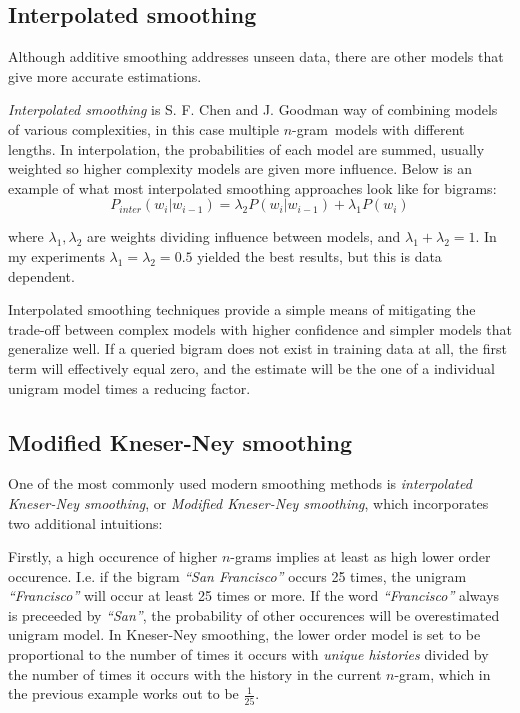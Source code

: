 \documentclass[a4paper,11pt]{kth-mag}
\newcommand{\ngram}{$n$-gram}
\begin{document}
\subsection{Interpolated smoothing}
Although additive smoothing addresses unseen data, there are other models that give more accurate estimations.

\emph{Interpolated smoothing} is S. F. Chen and J. Goodman way of combining models of various complexities,
in this case multiple \ngram~models with different lengths. In interpolation, the probabilities of each model are summed, usually weighted so higher complexity models are given more influence\cite{chen_goodman}.
Below is an example of what most interpolated smoothing approaches look like for bigrams:
\begin{equation}\label{eq:interpolated_smoothing}
  P_{inter}(w_i|w_{i-1}) =
  \lambda_2 P(w_i|w_{i-1}) + \lambda_1 P(w_i)
\end{equation}

where $\lambda_1, \lambda_2$ are weights dividing influence between models, and $\lambda_1 + \lambda_2 = 1$.
In my experiments $\lambda_1 = \lambda_2 = 0.5$ yielded the best results, but this is data dependent.

Interpolated smoothing techniques provide a simple means of mitigating
the trade-off between complex models with higher confidence
and simpler models that generalize well.
If a queried bigram does not exist in training data at all,
the first term will effectively equal zero,
and the estimate will be the one of a individual unigram model times a reducing factor.

\subsection{Modified Kneser-Ney smoothing}
One of the most commonly used modern smoothing methods is \emph{interpolated Kneser-Ney smoothing},
or \emph{Modified Kneser-Ney smoothing}\cite{nlp_book}, which incorporates two additional intuitions:

Firstly, a high occurence of higher \ngram s implies at least as high
lower order occurence. I.e. if the bigram \emph{``San Francisco''} occurs 25 times,
the unigram \emph{``Francisco''} will occur at least 25 times or more.
If the word \emph{``Francisco''} always is preceeded by  \emph{``San''},
the probability of other occurences will be overestimated unigram model.
In Kneser-Ney smoothing, the lower order model is set to be proportional to the
number of times it occurs with \emph{unique histories} divided by the number of times it
occurs with the history in the current \ngram\cite{chen_goodman}, which  in the previous example
works out to be $\frac{1}{25}$.
\end{document}
